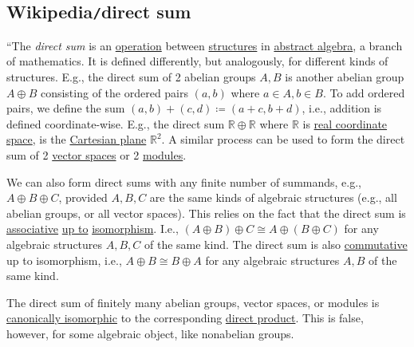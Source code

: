 \documentclass{article}
\begin{document}
\subsection{Wikipedia{\tt/}direct sum}
``The {\it direct sum} is an \href{https://en.wikipedia.org/wiki/Operation_(mathematics)}{operation} between \href{https://en.wikipedia.org/wiki/Mathematical_structure}{structures} in \href{https://en.wikipedia.org/wiki/Abstract_algebra}{abstract algebra}, a branch of mathematics. It is defined differently, but analogously, for different kinds of structures. E.g., the direct sum of 2 abelian groups $A,B$ is another abelian group $A\oplus B$ consisting of the ordered pairs $(a,b)$ where $a\in A,b\in B$. To add ordered pairs, we define the sum $(a,b) + (c,d)\coloneqq(a + c,b + d)$, i.e., addition is defined coordinate-wise. E.g., the direct sum $\mathbb{R}\oplus\mathbb{R}$ where $\mathbb{R}$ is \href{https://en.wikipedia.org/wiki/Real_coordinate_space}{real coordinate space}, is the \href{https://en.wikipedia.org/wiki/Cartesian_plane}{Cartesian plane} $\mathbb{R}^2$. A similar process can be used to form the direct sum of 2 \href{https://en.wikipedia.org/wiki/Vector_space}{vector spaces} or 2 \href{https://en.wikipedia.org/wiki/Module_(mathematics)}{modules}.

We can also form direct sums with any finite number of summands, e.g., $A\oplus B\oplus C$, provided $A,B,C$ are the same kinds of algebraic structures (e.g., all abelian groups, or all vector spaces). This relies on the fact that the direct sum is \href{https://en.wikipedia.org/wiki/Associative}{associative} \href{https://en.wikipedia.org/wiki/Up_to}{up to} \href{https://en.wikipedia.org/wiki/Isomorphism}{isomorphism}. I.e., $(A\oplus B)\oplus C\cong A\oplus(B\oplus C)$ for any algebraic structures $A,B,C$ of the same kind. The direct sum is also \href{https://en.wikipedia.org/wiki/Commutative}{commutative} up to isomorphism, i.e., $A\oplus B\cong B\oplus A$ for any algebraic structures $A,B$ of the same kind.

The direct sum of finitely many abelian groups, vector spaces, or modules is \href{https://en.wikipedia.org/wiki/Isomorphism}{canonically isomorphic} to the corresponding \href{https://en.wikipedia.org/wiki/Direct_product}{direct product}. This is false, however, for some algebraic object, like nonabelian groups.
\end{document}
